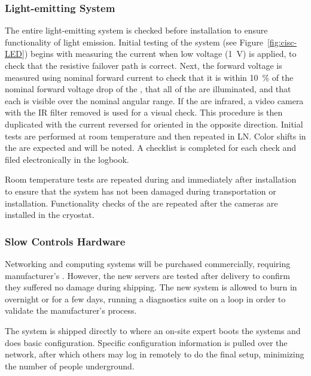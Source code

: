 \subsubsection{Light-emitting System}
\label{sec:fdgen-slow-cryo-qc-les}

The entire light-emitting system is checked before installation to ensure functionality of light emission. 
Initial testing of the system (see Figure~\ref{fig:cisc-LED}) begins with
measuring the current when low voltage (\SI{1}{V}) is applied, to check
that the resistive  failover path is correct. Next, the forward voltage is measured using nominal forward current to
check that it is within \SI{10}{\%} of the nominal forward voltage drop of
the , that all of the  are illuminated, and that each  is visible over the nominal angular range. If the  are
infrared, a video camera with the IR filter removed is used for a
visual check. This procedure is then duplicated with the current
reversed for  oriented in the opposite direction. Initial tests are performed at room temperature and then repeated in LN. Color shifts in the  are expected and will be noted. A checklist is completed for each  check and filed electronically in the  logbook.

Room temperature tests are repeated during and immediately after installation to ensure that the system has not been damaged during transportation or installation. Functionality checks of the  are repeated after the cameras are installed in the cryostat.

\subsubsection{Slow Controls Hardware}
\label{sec:fdsp-slow-cryo-qc-sc-hard}

Networking and computing systems will be purchased commercially, requiring manufacturer's . However, the new servers %
are tested after delivery to confirm they suffered no damage during shipping. The new system is allowed to burn in overnight or for a few days, 
running a diagnostics suite on a loop in order to validate %
the manufacturer's  process.

The system %
is shipped directly to \surf
where an on-site
expert %
boots the systems and does basic
configuration. %
Specific configuration information %
is pulled over
the network, after which others may log in remotely to do the final
setup, minimizing the number of people underground.


